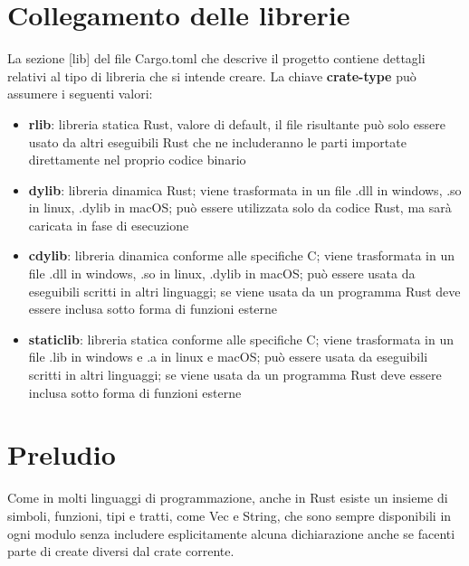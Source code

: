 

\section{Collegamento delle librerie}
La sezione [lib] del file Cargo.toml che descrive il progetto contiene dettagli
relativi al tipo di libreria che si intende creare. La chiave \textbf{crate-type}
può assumere i seguenti valori:


\begin{itemize}
  \item \textbf{rlib}: libreria statica Rust, valore di default,
        il file risultante può solo essere usato da altri eseguibili Rust che ne
        includeranno le parti importate direttamente nel proprio codice binario
  \item
        \textbf{dylib}: libreria dinamica Rust; viene trasformata in un file .dll in
        windows, .so in linux, .dylib in macOS; può essere utilizzata solo da codice
        Rust, ma sarà caricata in fase di esecuzione
  \item \textbf{cdylib}: libreria
        dinamica conforme alle specifiche C; viene trasformata in un file .dll in
        windows, .so in linux, .dylib in macOS; può essere usata da eseguibili scritti
        in altri linguaggi; se viene usata da un programma Rust deve essere inclusa
        sotto forma di funzioni esterne
  \item \textbf{staticlib}: libreria statica
        conforme alle specifiche C; viene trasformata in un file .lib in windows e .a in
        linux e macOS; può essere usata da eseguibili scritti in altri linguaggi; se
        viene usata da un programma Rust deve essere inclusa sotto forma di funzioni
        esterne
\end{itemize}

\section{Preludio}

Come in molti linguaggi di programmazione, anche in Rust esiste un insieme di
simboli, funzioni, tipi e tratti, come Vec e String, che sono sempre disponibili
in ogni modulo senza includere esplicitamente alcuna dichiarazione anche se facenti
parte di create diversi dal crate corrente.

